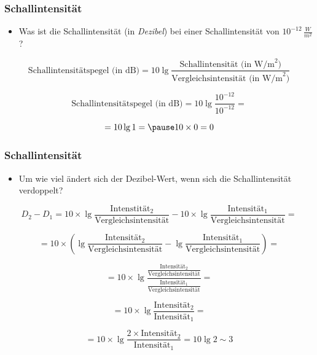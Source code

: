 \documentclass{beamer}
\begin{document}
\begin{frame}
\frametitle{Schallintensität}

\begin{itemize}
\item
Was ist die Schallintensität (in \emph{Dezibel}) bei einer Schallintensität von \(10^{-12}\,\frac{W}{m^2}\)?

\end{itemize}

\[
\text{Schallintensitätspegel (in dB)} = 10 \lg \frac{\text{Schallintensität (in W/m}^2\text{)}}{\text{Vergleichsintensität (in W/m}^2\text{)}} 
\]


\[
\text{Schallintensitätspegel (in dB)} = 10 \lg \frac{10^{-12}}{10^{-12}}  = 
\]

\pause
\[
= 10 \lg 1 = \pause 10\times 0 = 0
\]


\end{frame}


\begin{frame}
\frametitle{Schallintensität}


\begin{itemize}
\item
Um wie viel ändert sich der Dezibel-Wert, wenn sich die Schallintensität verdoppelt?
\end{itemize}

\[
D_2 - D_1 = 10\times \lg \frac{\text{Intenstität}_2}{\text{Vergleichsintensität}} - 10\times \lg \frac{\text{Intensität}_1}{\text{Vergleichsintensität}} =
\]

\pause


\[
= 10 \times \left( \lg \frac{\text{Intensität}_2}{\text{Vergleichsintensität}} -  \lg \frac{\text{Intensität}_1}{\text{Vergleichsintensität}} \right)  =
\]

\pause


\[
= 10 \times \lg \frac{\frac{\text{Intensität}_2}{\text{Vergleichsintensität}}}{\frac{\text{Intensität}_1}{\text{Vergleichsintensität}}} =
\]

\pause


\[
= 10 \times \lg \frac{\text{Intensität}_2}{\text{Intensität}_1} =
\]

\pause


\[
= 10 \times \lg  \frac{2\times \text{Intensität}_2}{\text{Intensität}_1} = 10 \lg 2 \sim 3
\]


\end{frame}




\end{document}
